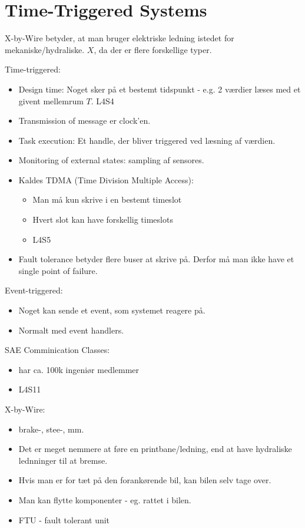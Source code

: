 \documentclass[oneside, 10pt]{article}
\begin{document}
\newpage
\section{Time-Triggered Systems}

X-by-Wire betyder, at man bruger elektriske ledning istedet for mekaniske/hydraliske. 
$X$, da der er flere forskellige typer.

Time-triggered:
\begin{itemize}
	\item Design time: Noget sker på et bestemt tidspunkt - e.g. 2 værdier læses med et givent mellemrum $T$. L4S4
	\item Transmission of message er clock'en.
	\item Task execution: Et handle, der bliver triggered ved læsning af værdien.
	\item Monitoring of external states: sampling af sensores.
	\item Kaldes TDMA (Time Division Multiple Access):
	\begin{itemize}
		\item Man må kun skrive i en bestemt timeslot
		\item Hvert slot kan have forskellig timeslots
		\item L4S5
	\end{itemize}
	\item Fault tolerance betyder flere buser at skrive på. Derfor må man ikke have et single point of failure.
\end{itemize}

Event-triggered:
\begin{itemize}
	\item Noget kan sende et event, som systemet reagere på.
	\item Normalt med event handlers.
\end{itemize}

SAE Comminication Classes:
\begin{itemize}
	\item har ca. 100k ingeniør medlemmer
	\item L4S11
\end{itemize}

X-by-Wire:
\begin{itemize}
	\item brake-, stee-,  mm.
	\item Det er meget nemmere at føre en printbane/ledning, end at have hydraliske lednninger til at bremse.
	\item Hvis man er for tæt på den forankørende bil, kan bilen selv tage over.
	\item Man kan flytte komponenter - eg. rattet i bilen.
	\item FTU - fault tolerant unit
\end{itemize}
\end{document}
